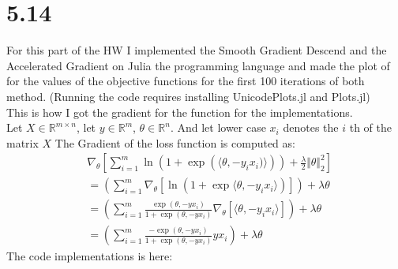 \documentclass[]{article}
\begin{document}
\section*{5.14}
    For this part of the HW I implemented the Smooth Gradient Descend and the Accelerated Gradient on Julia the programming language and made the plot of for the values of the objective functions for the first 100 iterations of both method. (Running the code requires installing UnicodePlots.jl and Plots.jl)
    \\
    This is how I got the gradient for the function for the implementations. 
    \\
    Let $X\in \mathbb{R}^{m\times n}$, let $y\in \mathbb{R}^m$, $\theta \in \mathbb{R}^n$. And let lower case $x_i$ denotes the $i$ th of the matrix $X$ The Gradient of the loss function is computed as: 
    \begin{align*}\tag{5.14.1}\label{eqn:5.14.1}
        & \nabla_\theta \left[
            \sum_{i = 1}^{m}\ln(1 + \exp \left(
                \langle \theta, -y_ix_i)\rangle
            \right)) + \frac{\lambda}{2}\Vert \theta\Vert_2^2
        \right]
        \\
        &= 
        \left(
            \sum_{i = 1}^{m}
            \nabla_\theta \left[
                \ln\left(
                    1 + \exp \langle \theta, -y_i x_i\rangle
                \right)
            \right]    
        \right) + \lambda\theta
        \\
        &= \left(
            \sum_{i = 1}^{m}\frac{
                \exp(\theta, -y x_i)
            }{1 + \exp(\theta, -y x_i)}
            \nabla_\theta[
                \langle \theta, -y_ix_i\rangle
            ] 
        \right) + \lambda \theta
        \\
        &= 
        \left(
            \sum_{i = 1}^{m}\frac{
                -\exp(\theta, -y x_i)
            }{1 + \exp(\theta, -y x_i)}
            yx_i
        \right) + \lambda \theta
    \end{align*}
    The code implementations is here: 
\end{document}
